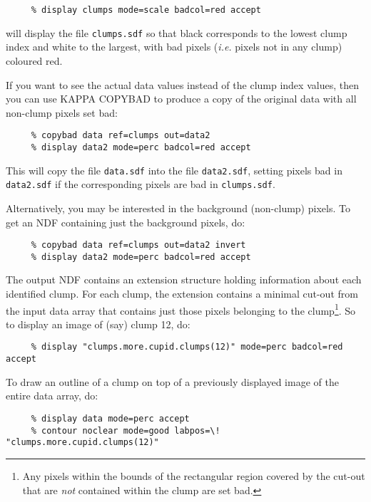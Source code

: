 \documentclass[twoside,11pt]{article}
\newcommand{\xref}[3]{#1}
\renewcommand{\_}{\texttt{\symbol{95}}}
\begin{document}
\small
\begin{verbatim}
     % display clumps mode=scale badcol=red accept
\end{verbatim}
\normalsize

will display the file \verb+clumps.sdf+ so that black corresponds to the
lowest clump index and white to the largest, with bad pixels (\emph{i.e.}
pixels not in any clump) coloured red.

If you want to see the actual data values instead of the clump index
values, then you can use KAPPA \xref{COPYBAD}{sun95}{COPYBAD} to produce a
copy of the original data with all non-clump pixels set bad:

\small
\begin{verbatim}
     % copybad data ref=clumps out=data2
     % display data2 mode=perc badcol=red accept
\end{verbatim}
\normalsize

This will copy the file \verb+data.sdf+ into the file \verb+data2.sdf+,
setting pixels bad in \verb+data2.sdf+ if the corresponding pixels
are bad in  \verb+clumps.sdf+.

Alternatively, you may be interested in the background (non-clump)
pixels. To get an NDF containing just the background pixels, do:

\small
\begin{verbatim}
     % copybad data ref=clumps out=data2 invert
     % display data2 mode=perc badcol=red accept
\end{verbatim}
\normalsize

The output NDF contains an extension structure holding information
about each identified clump. For each clump, the extension contains a 
minimal cut-out from the input data array that contains just those pixels
belonging to the clump\footnote{Any pixels within the bounds of the
rectangular region covered by the cut-out that are \emph{not} contained
within the clump are set bad.}. So to display an image of (say) clump 12,
do:

\small
\begin{verbatim}
     % display "clumps.more.cupid.clumps(12)" mode=perc badcol=red accept
\end{verbatim}
\normalsize

To draw an outline of a clump on top of a previously displayed image of
the entire data array, do:

\small
\begin{verbatim}
     % display data mode=perc accept
     % contour noclear mode=good labpos=\! "clumps.more.cupid.clumps(12)"
\end{verbatim}
\normalsize
\end{document}
